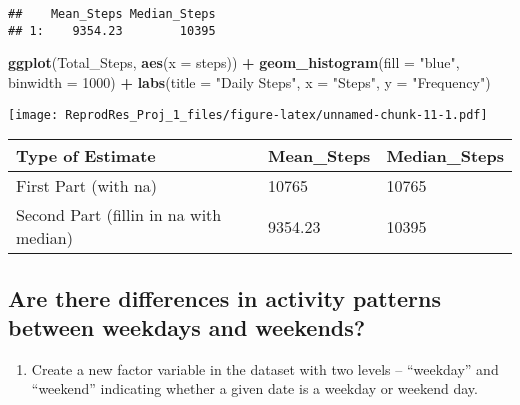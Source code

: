 \documentclass[
]{article}
\newenvironment{Shaded}{\begin{snugshade}}{\end{snugshade}}
\newcommand{\DataTypeTok}[1]{\textcolor[rgb]{0.13,0.29,0.53}{#1}}
\newcommand{\DecValTok}[1]{\textcolor[rgb]{0.00,0.00,0.81}{#1}}
\newcommand{\KeywordTok}[1]{\textcolor[rgb]{0.13,0.29,0.53}{\textbf{#1}}}
\newcommand{\NormalTok}[1]{#1}
\newcommand{\OperatorTok}[1]{\textcolor[rgb]{0.81,0.36,0.00}{\textbf{#1}}}
\newcommand{\StringTok}[1]{\textcolor[rgb]{0.31,0.60,0.02}{#1}}
\providecommand{\tightlist}{%
  \setlength{\itemsep}{0pt}\setlength{\parskip}{0pt}}
\begin{document}
\begin{verbatim}
##    Mean_Steps Median_Steps
## 1:    9354.23        10395
\end{verbatim}

\begin{Shaded}
\begin{Highlighting}[]
\KeywordTok{ggplot}\NormalTok{(Total_Steps, }\KeywordTok{aes}\NormalTok{(}\DataTypeTok{x =}\NormalTok{ steps)) }\OperatorTok{+}\StringTok{ }
\StringTok{  }\KeywordTok{geom_histogram}\NormalTok{(}\DataTypeTok{fill =} \StringTok{"blue"}\NormalTok{, }\DataTypeTok{binwidth =} \DecValTok{1000}\NormalTok{) }\OperatorTok{+}\StringTok{ }
\StringTok{  }\KeywordTok{labs}\NormalTok{(}\DataTypeTok{title =} \StringTok{"Daily Steps"}\NormalTok{, }\DataTypeTok{x =} \StringTok{"Steps"}\NormalTok{, }\DataTypeTok{y =} \StringTok{"Frequency"}\NormalTok{)}
\end{Highlighting}
\end{Shaded}

\texttt{[image: ReprodRes\_Proj\_1\_files/figure-latex/unnamed-chunk-11-1.pdf]}

\begin{longtable}[]{@{}lll@{}}
\toprule
Type of Estimate & Mean\_Steps & Median\_Steps\tabularnewline
\midrule
\endhead
First Part (with na) & 10765 & 10765\tabularnewline
Second Part (fillin in na with median) & 9354.23 & 10395\tabularnewline
\bottomrule
\end{longtable}

\hypertarget{are-there-differences-in-activity-patterns-between-weekdays-and-weekends}{%
\subsection{Are there differences in activity patterns between weekdays
and
weekends?}\label{are-there-differences-in-activity-patterns-between-weekdays-and-weekends}}

\begin{enumerate}
\def\labelenumi{\arabic{enumi}.}
\tightlist
\item
  Create a new factor variable in the dataset with two levels --
  ``weekday'' and ``weekend'' indicating whether a given date is a
  weekday or weekend day.
\end{enumerate}
\end{document}
